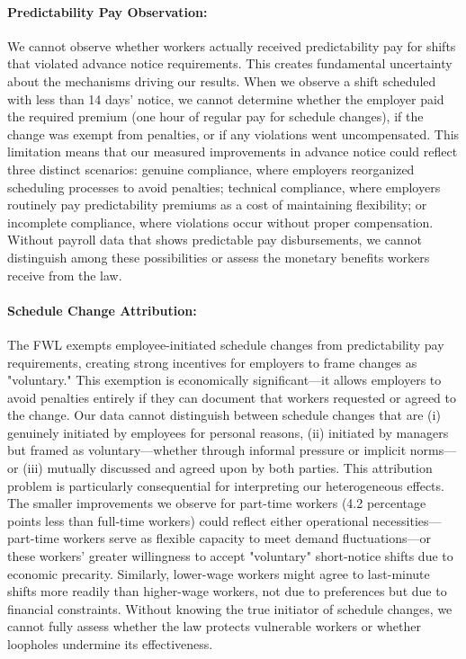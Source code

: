 \documentclass[letterpaper,11pt,leqno]{article}
\theoremstyle{paper}
\begin{document}
\paragraph{Predictability Pay Observation:} We cannot observe whether workers actually received predictability pay for shifts that violated advance notice requirements. This creates fundamental uncertainty about the mechanisms driving our results. When we observe a shift scheduled with less than 14 days' notice, we cannot determine whether the employer paid the required premium (one hour of regular pay for schedule changes), if the change was exempt from penalties, or if any violations went uncompensated. This limitation means that our measured improvements in advance notice could reflect three distinct scenarios: genuine compliance, where employers reorganized scheduling processes to avoid penalties; technical compliance, where employers routinely pay predictability premiums as a cost of maintaining flexibility; or incomplete compliance, where violations occur without proper compensation. Without payroll data that shows predictable pay disbursements, we cannot distinguish among these possibilities or assess the monetary benefits workers receive from the law.

\paragraph{Schedule Change Attribution:} The FWL exempts employee-initiated schedule changes from predictability pay requirements, creating strong incentives for employers to frame changes as "voluntary." This exemption is economically significant—it allows employers to avoid penalties entirely if they can document that workers requested or agreed to the change. Our data cannot distinguish between schedule changes that are (i) genuinely initiated by employees for personal reasons, (ii) initiated by managers but framed as voluntary—whether through informal pressure or implicit norms—or (iii) mutually discussed and agreed upon by both parties. This attribution problem is particularly consequential for interpreting our heterogeneous effects. The smaller improvements we observe for part-time workers (4.2 percentage points less than full-time workers) could reflect either operational necessities—part-time workers serve as flexible capacity to meet demand fluctuations—or these workers' greater willingness to accept "voluntary" short-notice shifts due to economic precarity. Similarly, lower-wage workers might agree to last-minute shifts more readily than higher-wage workers, not due to preferences but due to financial constraints. Without knowing the true initiator of schedule changes, we cannot fully assess whether the law protects vulnerable workers or whether loopholes undermine its effectiveness.
\end{document}
